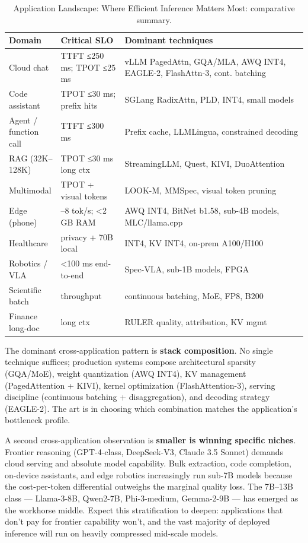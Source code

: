 \documentclass{article}
\begin{document}
\begin{table}[t]
\centering
\caption{Application Landscape: Where Efficient Inference Matters Most: comparative summary.}
\label{tab:application-landscape-where-efficient-inference-matters-most}
\begin{tabular}{>{\raggedright\arraybackslash}p{0.1795\linewidth}
  >{\raggedright\arraybackslash}p{0.2137\linewidth}
  >{\raggedright\arraybackslash}p{0.6068\linewidth}}
\toprule
Domain & Critical SLO & Dominant techniques \\
\midrule
Cloud chat & TTFT ≤250 ms; TPOT ≤25 ms & vLLM PagedAttn, GQA/MLA, AWQ INT4, EAGLE-2, FlashAttn-3, cont. batching \\
Code assistant & TPOT ≤30 ms; prefix hits & SGLang RadixAttn, PLD, INT4, small models \\
Agent / function call & TTFT ≤300 ms & Prefix cache, LLMLingua, constrained decoding \\
RAG (32K--128K) & TPOT ≤30 ms long ctx & StreamingLLM, Quest, KIVI, DuoAttention \\
Multimodal & TPOT + visual tokens & LOOK-M, MMSpec, visual token pruning \\
Edge (phone) & 5--8 tok/s; \textless2 GB RAM & AWQ INT4, BitNet b1.58, sub-4B models, MLC/llama.cpp \\
Healthcare & privacy + 70B local & INT4, KV INT4, on-prem A100/H100 \\
Robotics / VLA & \textless100 ms end-to-end & Spec-VLA, sub-1B models, FPGA \\
Scientific batch & throughput & continuous batching, MoE, FP8, B200 \\
Finance long-doc & long ctx & RULER quality, attribution, KV mgmt \\
\end{tabular}
\end{table}

The dominant cross-application pattern is \textbf{stack composition}. No single technique suffices; production systems compose architectural sparsity (GQA/MoE), weight quantization (AWQ INT4), KV management (PagedAttention + KIVI), kernel optimization (FlashAttention-3), serving discipline (continuous batching + disaggregation), and decoding strategy (EAGLE-2). The art is in choosing which combination matches the application's bottleneck profile.

A second cross-application observation is \textbf{smaller is winning specific niches}. Frontier reasoning (GPT-4-class, DeepSeek-V3, Claude 3.5 Sonnet) demands cloud serving and absolute model capability. Bulk extraction, code completion, on-device assistants, and edge robotics increasingly run sub-7B models because the cost-per-token differential outweighs the marginal quality loss. The 7B--13B class --- Llama-3-8B, Qwen2-7B, Phi-3-medium, Gemma-2-9B --- has emerged as the workhorse middle. Expect this stratification to deepen: applications that don't pay for frontier capability won't, and the vast majority of deployed inference will run on heavily compressed mid-scale models.
\end{document}
